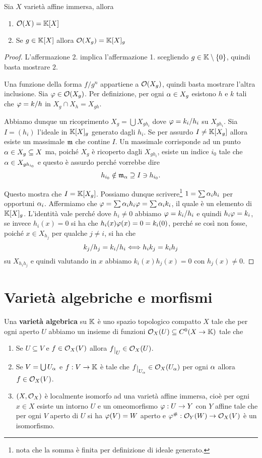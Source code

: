 \begin{lemma}
Sia $X$ variet\`a affine immersa, allora
\begin{enumerate}
	\item $\mathcal{O}(X)=\mathbb{K}[X]$
	\item Se $g\in\mathbb{K}[X]$ allora $\mathcal{O}(X_g)=\mathbb{K}[X]_g$
\end{enumerate}
\end{lemma}
\begin{proof}
L'affermazione 2. implica l'affermazione 1. scegliendo $g\in\mathbb{K}\setminus\{0\}$, quindi basta mostrare $2$.

Una funzione della forma $f/g^n$ appartiene a $\mathcal{O}(X_g)$, quindi basta mostrare l'altra inclusione. Sia $\varphi\in \mathcal{O}(X_g)$. Per definizione, per ogni $\alpha\in X_g$ esistono $h$ e $k$ tali che $\varphi=k/h$ in $X_g\cap X_h=X_{gh}$.

Abbiamo dunque un ricoprimento $X_g=\bigcup X_{gh_i}$ dove $\varphi=k_i/h_i$ su $X_{gh_i}$. Sia $I=(h_i)$ l'ideale in $\mathbb{K}[X]_g$ generato dagli $h_i$. Se per assurdo $I\neq \mathbb{K}[X_g]$ allora esiste un massimale $\mathfrak{m}$ che contine $I$. Un massimale corrisponde ad un punto $\alpha\in X_g\subseteq X$ ma, poich\'e $X_g$ \`e ricoperto dagli $X_{gh_i}$, esiste un indice $i_0$ tale che $\alpha\in X_{gh_{i_0}}$ e questo \`e assurdo perch\'e vorrebbe dire 
\[h_{i_0}\notin \mathfrak{m}_\alpha\supseteq I\ni h_{i_0}.\]

Questo mostra che $I=\mathbb{K}[X_g]$. Possiamo dunque scrivere\footnote{nota che la somma \`e finita per definizione di ideale generato.} $1=\sum \alpha_i h_i$ per opportuni $\alpha_i$. Affermiamo che $\varphi=\sum \alpha_i h_i\varphi=\sum \alpha_i k_i$, il quale \`e un elemento di $\mathbb{K}[X]_g$. L'identit\`a vale perch\'e dove $h_i\neq 0$ abbiamo $\varphi=k_i/h_i$ e quindi $h_i\varphi=k_i$, se invece $h_i(x)=0$ si ha che $h_i(x)\varphi(x)=0=k_i(0)$, perch\'e se cos\`i non fosse, poich\'e $x\in X_{h_j}$ per qualche $j\neq i$, si ha che \[k_j/h_j=k_i/h_i\Longleftrightarrow h_ik_j=k_ih_j\] su $X_{h_ih_j}$ e quindi valutando in $x$ abbiamo $k_i(x)h_j(x)=0$ con $h_j(x)\neq 0$.
\end{proof}

\section{Variet\`a algebriche e morfismi}
\begin{definition}
Una \textbf{variet\`a algebrica} su $\mathbb{K}$ \`e uno spazio topologico compatto $X$ tale che per ogni aperto $U$ abbiamo un insieme di funzioni $\mathcal{O}_X(U)\subseteq C^0(X\to \mathbb{K})$ tale che
\begin{enumerate}
	\item Se $U\subseteq V$ e $f\in \mathcal{O}_X(V)$ allora $f\res U\in \Oc_X(U)$.
	\item Se $V=\bigcup U_\alpha$ e $f:V\to \mathbb{K}$ \`e tale che $f\res{U_\al}\in \Oc_X(U_\al)$ per ogni $\alpha$ allora $f\in \mathcal{O}_X(V)$.
	\item $(X,\mathcal{O}_X)$ \`e localmente isomorfo ad una variet\`a affine immersa, cio\`e per ogni $x\in X$ esiste un intorno $U$ e un omeomorfismo $\varphi:U\to Y$ con $Y$ affine tale che per ogni $V$ aperto di $U$ si ha $\varphi(V)=W$ aperto e $\varphi^\#:\mathcal{O}_Y(W)\to\mathcal{O}_X(V)$ \`e un isomorfismo.
\end{enumerate}
\end{definition}

